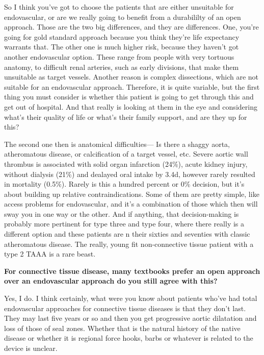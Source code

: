 \documentclass[
]{book}
\begin{document}
So I think you've got to choose the patients that are either unsuitable
for endovascular, or are we really going to benefit from a durabililty
of an open approach. Those are the two big differences, and they are
differences. One, you're going for gold standard approach because you
think they're life expectancy warrants that. The other one is much
higher risk, because they haven't got another endovascular option. These
range from people with very tortuous anatomy, to difficult renal
arteries, such as early divisions, that make them unsuitable as target
vessels. Another reason is complex dissections, which are not suitable
for an endovascular approach. Therefore, it is quite variable, but the
first thing you must consider is whether this patient is going to get
through this and get out of hospital. And that really is looking at them
in the eye and considering what's their quality of life or what's their
family support, and are they up for this?

The second one then is anatomical difficulties--- Is there a shaggy
aorta, atheromatous disease, or calcification of a target vessel, etc.
Severe aortic wall thrombus is associated with solid organ infarction
(24\%), acute kidney injury, without dialysis (21\%) and dealayed oral
intake by 3.4d, however rarely resulted in mortality
(0.5\%).\citep{ribeiro2017} Rarely is this a hundred percent or 0\% decision,
but it's about building up relative contraindications. Some of them are
pretty simple, like access problems for endovascular, and it's a
combination of those which then will sway you in one way or the other.
And if anything, that decision-making is probably more pertinent for
type three and type four, where there really is a different option and
these patients are n their sixties and seventies with classic
atheromatous disease. The really, young fit non-connective tissue
patient with a type 2 TAAA is a rare beast.

\textbf{For connective tissue disease, many textbooks prefer an open approach
over an endovascular approach do you still agree with this?}

Yes, I do. I think certainly, what were you know about patients who've
had total endovascular approaches for connective tissue diseases is that
they don't last. They may last five years or so and then you get
progressive aortic dilatation and loss of those of seal zones. Whether
that is the natural history of the native disease or whether it is
regional force hooks, barbs or whatever is related to the device is
unclear.
\end{document}

